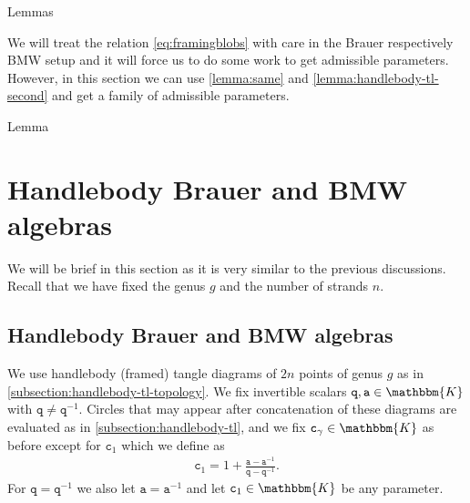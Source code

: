 \documentclass[a4paper,11pt]{amsart}
\newcommand{\KK}{\mathbbm{K}}
\newcommand{\varsym}[1]{\mathtt{#1}}
\newcommand{\qvar}{\varsym{q}}
\newcommand{\cvar}{\varsym{c}}
\newcommand{\avar}{\varsym{a}}
\numberwithin{equation}{section}
\let\fullref\autoref
\def\makeautorefname#1#2{\expandafter\def\csname#1autorefname\endcsname{#2}}
\begin{document}
\makeautorefname{lemma}{Lemmas}

\begin{remark}
We will treat the relation \eqref{eq:framingblobs} 
with care in the Brauer respectively BMW setup 
and it will force us to do 
some work to get admissible parameters. However, in this section 
we can use \fullref{lemma:same} and \ref{lemma:handlebody-tl-second} 
and get a family of admissible parameters.
\end{remark}

\makeautorefname{lemma}{Lemma}

\section{Handlebody Brauer and BMW algebras}\label{section:brauer}

We will be brief in this section as it is very similar 
to the previous discussions. Recall that we have fixed the genus $g$ and 
the number of strands $n$.

\subsection{Handlebody Brauer and BMW algebras}\label{subsection:BMW}

We use handlebody 
(framed) tangle diagrams of $2n$ 
points of genus $g$ as in \fullref{subsection:handlebody-tl-topology}.
We fix invertible scalars 
$\qvar,\avar\in\KK$ with $\qvar\neq\qvar^{-1}$.
Circles that may appear after concatenation of these diagrams 
are evaluated as in \fullref{subsection:handlebody-tl}, and we 
fix $\cvar_{\gamma}\in\KK$ as before except for 
$\cvar_{1}$ which we define as
\begin{gather*}
\cvar_{1}=1+\frac{\avar-\avar^{-1}}{\qvar-\qvar^{-1}}.
\end{gather*}
For $\qvar=\qvar^{-1}$ we also let $\avar=\avar^{-1}$
and let $\cvar_{1}\in\KK$ be any parameter.
\end{document}
